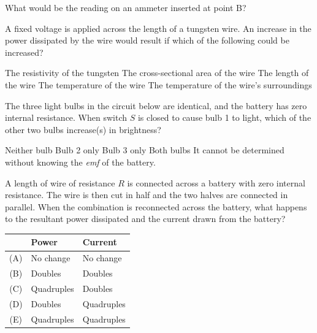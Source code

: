 \documentclass[12pt]{../../oss-apphys-exam}
\begin{document}
\begin{questions}
  \question What would be the reading on an ammeter inserted at point B?
  \label{rcirc2}
  \newpage
  
  \question A fixed voltage is applied across the length of a tungsten wire. An
  increase in the power dissipated by the wire would result if which of the
  following could be increased?
  \begin{choices}
    \choice The resistivity of the tungsten
    \choice The cross-sectional area of the wire
    \choice The length of the wire
    \choice The temperature of the wire
    \choice The temperature of the wire’s surroundings
  \end{choices}
  \newpage
  

  \question The three light bulbs in the circuit below are identical, and the
  battery has zero internal resistance. When switch $S$ is closed to cause
  bulb 1 to light, which of the other two bulbs increase(s) in brightness?
  \begin{choices}
    \choice Neither bulb
    \choice Bulb 2 only
    \choice Bulb 3 only
    \choice Both bulbs
    \choice It cannot be determined without knowing the \emph{emf} of the
    battery.
  \end{choices}
  \newpage
  
  \question A length of wire of resistance $R$ is connected across a battery
  with zero internal resistance. The wire is then cut in half and the two
  halves are connected in parallel. When the combination is reconnected across
  the battery, what happens to the resultant power dissipated and the current
  drawn from the battery?

  \begin{tabular}{cll}
    & \textbf{Power} & \textbf{Current}\\\hline
    (A) & No change  & No change \\
    (B) & Doubles    & Doubles   \\
    (C) & Quadruples & Doubles   \\
    (D) & Doubles    & Quadruples\\
    (E) & Quadruples & Quadruples
  \end{tabular}
  \newpage
  

\end{questions}
\end{document}
